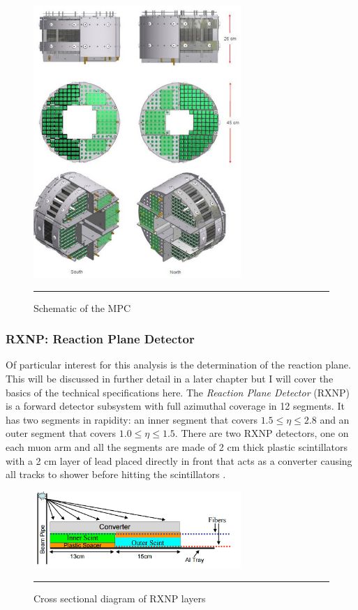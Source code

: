 \begin{figure}[h!]
  \centering
    \includegraphics[width=0.7\textwidth]{Figures/mpcschematic.JPG}
    \rule{35em}{0.5pt}
  \caption[Schematic of the MPC]{Schematic of the MPC}
  \label{fig:mpcschematic}
\end{figure}

\subsubsection{RXNP: Reaction Plane Detector}
Of particular interest for this analysis is the determination of the reaction plane. This will be discussed in further detail in a later chapter but I will cover the basics of the technical specifications here. The \textit{Reaction Plane Detector} (RXNP) is a forward detector subsystem \citep{RXNPfocus} with full azimuthal coverage in 12 segments. It has two segments in rapidity: an inner segment that covers $1.5 \leq \eta \leq 2.8$ and an outer segment that covers $1.0 \leq \eta \leq 1.5$. There are two RXNP detectors, one on each muon arm and all the segments are made of 2 cm thick plastic scintillators with a 2 cm layer of lead placed directly in front that acts as a converter causing all tracks to shower before hitting the scintillators \citep{RXNPfocusER}.  

\begin{figure}[h!]
  \centering
    \includegraphics[width=0.7\textwidth]{Figures/RXNPschem.jpg}
    \rule{35em}{0.5pt}
  \caption[Cross sectional diagram of RXNP layers]{Cross sectional diagram of RXNP layers}
  \label{fig:RXNP}
\end{figure}

